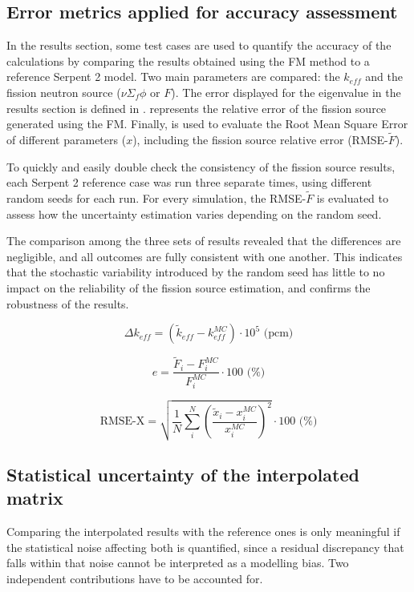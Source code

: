 \documentclass[preprint,review,12pt]{elsarticle}
\newif\ifhighlight
\newcommand{\rtwocolor}{\ifhighlight\color{revtwo}\fi}
\begin{document}
\subsection{Error metrics applied for accuracy assessment}

In the results section, some test cases are used to quantify the accuracy of the calculations by comparing the results obtained using the FM method to a reference Serpent 2 model. Two main parameters are compared: the $k_{eff}$ and the fission neutron source ($\nu\Sigma_f\phi$ or $F$). The error displayed for the eigenvalue in the results section is defined in .  represents the relative error of the fission source generated using the FM. Finally,  is used to evaluate the Root Mean Square Error of different parameters ($x$), including the fission source relative error (RMSE-$\tilde{F}$). 

To quickly and easily double check the consistency of the fission source results, each Serpent 2 reference case was run three separate times, using different random seeds for each run. For every simulation, the RMSE-$\tilde{F}$ is evaluated to assess how the uncertainty estimation varies depending on the random seed.

The comparison among the three sets of results revealed that the differences are negligible, and all outcomes are fully consistent with one another. This indicates that the stochastic variability introduced by the random seed has little to no impact on the reliability of the fission source estimation, and confirms the robustness of the results.    

\begin{equation}
    \Delta k_{eff} = \left( \tilde{k}_{eff} - k^{MC}_{eff} \right)\cdot 10^{5} \text{ (pcm)}
\label{eq:keff_err}
\end{equation}


\begin{equation}
    e = \frac{\tilde{F}_i-F_i^{MC}}{F_i^{MC}} \cdot 100 \text{ (\%)}
\label{eq:fission_source_rel_err}
\end{equation}


\begin{equation}
    \text{RMSE-X}  = \sqrt{\frac{1}{N} \sum_i^N \left( \frac{\tilde{x}_i-x_{i}^{MC}}{x^{MC}_{i}} \right)^2 }\cdot 100 \text{ (\%)}
\label{eq:fission_source_RMS_err}
\end{equation}


\begingroup\rtwocolor
\subsection{Statistical uncertainty of the interpolated matrix} \label{subsec:Uncertainty}
Comparing the interpolated results with the reference ones is only meaningful if the statistical noise affecting both is quantified, since a residual discrepancy that falls within that noise cannot be interpreted as a modelling bias. Two independent contributions have to be accounted for.
\end{document}

